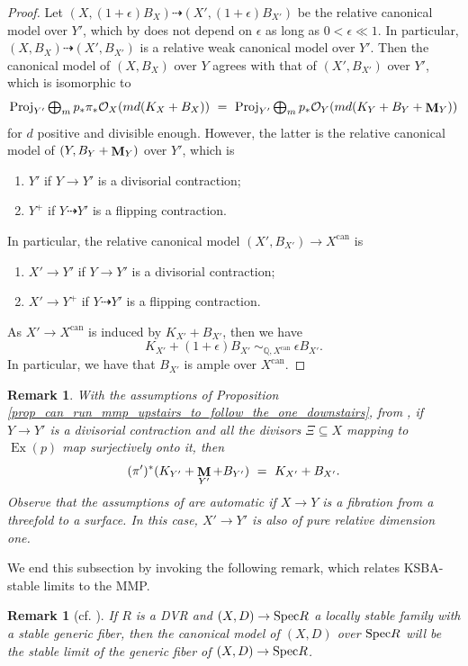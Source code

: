 \documentclass[a4paper,12pt]{amsart}
\DeclareMathOperator{\Proj}{Proj}
\newcommand{\bQ}{{\mathbb Q}}
\newcommand{\cO}{{\mathcal{O}}}
\DeclareMathOperator{\can}{can}
\DeclareMathOperator{\Exc}{Ex}
\DeclareMathOperator{\bfM}{{\bf{M}}}
\newcommand\spec{\text{\rm Spec}}
\newtheorem{remark}[theorem]{Remark}
\theoremstyle{definition}
\theoremstyle{remark}
\begin{document}
\begin{proof}
Let $(X,(1+\epsilon)B_X)\dashrightarrow (X',(1+\epsilon)B_{X'})$ be the relative canonical model over $Y'$, which by \cite[Theorem 5.59]{HK} does not depend on $\epsilon$ as long as $0<\epsilon \ll 1$. In particular, $(X,B_X)\dashrightarrow (X',B_{X'})$ is a relative weak canonical model over $Y'$. Then the canonical model of $(X,B_X)$ over $Y$ agrees with that of $(X',B_{X'})$ over $Y'$, which is isomorphic to 
\[\textstyle
\Proj_{Y'} \bigoplus_m p_*\pi_*\cO_X(md(K_X+B_{X})) \ = \  \Proj_{Y'} \bigoplus_m p_*\cO_Y(md(K_Y+B_{Y} + \bfM_Y))
\]
for $d$ positive and divisible enough.
However, the latter is the relative canonical model of $(Y,B_Y+\bfM_Y)$ over $Y'$, which is
\begin{enumerate}
    \item $Y'$ if $Y\to Y'$ is a divisorial contraction;
    \item $Y^+$ if $Y\dashrightarrow Y'$ is a flipping contraction.
\end{enumerate}
In particular, the relative canonical model $(X',B_{X'})\to X^{\can}$ is
\begin{enumerate}
    \item $X'\to Y'$ if $Y\to Y'$ is a divisorial contraction;
    \item $X'\to Y^+$ if $Y\dashrightarrow Y'$ is a flipping contraction.
\end{enumerate} As $X'\to X^{\can}$ is induced by $K_{X'}+B_{X'}$, then we have 
\[
K_{X'} + (1+\epsilon)B_{X'}  \ \sim_{\bQ,X^{\can}} \ \epsilon B_{X'}.
\]
In particular, we have that $B_{X'}$ is ample over $X^{\can}$.
\end{proof}


\begin{remark}\label{rmk_during_MMP_pull_back_of_lc_divisor_is_lc_divispr}\textup{
    With the assumptions of Proposition \ref{prop_can_run_mmp_upstairs_to_follow_the_one_downstairs}, from , if $Y\to Y'$ is a divisorial contraction and all the divisors $\Xi \subseteq X$ mapping to $\Exc(p)$ map surjectively onto it, then \[(\pi')^*(K_{Y'}+\bfM_{Y'}+B_{Y'}) \ =\  K_{X'}+B_{X'}.\] Observe that the assumptions of  are automatic if $X\rightarrow Y$ is a fibration from a threefold to a surface. In this case, $X'\to Y'$ is also of pure relative dimension one. %
}\end{remark}
We end this subsection by invoking the following remark, which relates KSBA-stable limits to the MMP.
\begin{remark}[\textup{cf. \cite[Corollary 4.57]{Kol23}}]
    \textup{If $R$ is a DVR and $(X,D)\to \spec R $ a locally stable family with a stable generic fiber, then the canonical model of $(X,D)$ over $\spec R $ will be the stable limit of the generic fiber of $(X,D)\to \spec R $.}
\end{remark}
\end{document}
